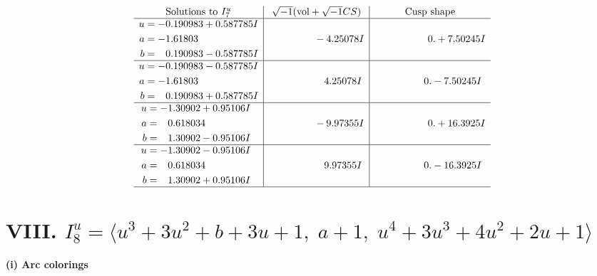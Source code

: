 \documentclass[1p]{elsarticle_modified}
\theoremstyle{definition}
\newcommand{\I}{\sqrt{-1}}
\begin{document}
$$\begin{array}{c|c|c}  
\text{Solutions to }I^u_{7}& \I (\text{vol} + \sqrt{-1}CS) & \text{Cusp shape}\\
 \hline 
\begin{aligned}
u &= -0.190983 + 0.587785 I \\
a &= -1.61803\phantom{ +0.000000I} \\
b &= \phantom{-}0.190983 - 0.587785 I\end{aligned}
 & \phantom{-0.000000 } -4.25078 I & \phantom{-0.000000 -}0. + 7.50245 I \\ \hline\begin{aligned}
u &= -0.190983 - 0.587785 I \\
a &= -1.61803\phantom{ +0.000000I} \\
b &= \phantom{-}0.190983 + 0.587785 I\end{aligned}
 & \phantom{-0.000000 -}4.25078 I & \phantom{-0.000000 } 0. - 7.50245 I \\ \hline\begin{aligned}
u &= -1.30902 + 0.95106 I \\
a &= \phantom{-}0.618034\phantom{ +0.000000I} \\
b &= \phantom{-}1.30902 - 0.95106 I\end{aligned}
 & \phantom{-0.000000 } -9.97355 I & \phantom{-0.000000 -}0. + 16.3925 I \\ \hline\begin{aligned}
u &= -1.30902 - 0.95106 I \\
a &= \phantom{-}0.618034\phantom{ +0.000000I} \\
b &= \phantom{-}1.30902 + 0.95106 I\end{aligned}
 & \phantom{-0.000000 -}9.97355 I & \phantom{-0.000000 } 0. - 16.3925 I\\
 \hline 
 \end{array}$$\newpage\newpage\renewcommand{\arraystretch}{1}
\centering \section*{VIII. $I^u_{8}= \langle u^3+3 u^2+b+3 u+1,\;a+1,\;u^4+3 u^3+4 u^2+2 u+1 \rangle$}
\flushleft \textbf{(i) Arc colorings}\\
\end{document}
